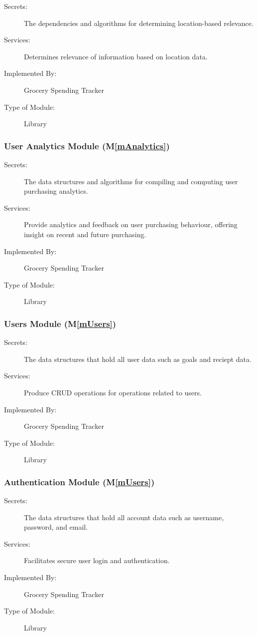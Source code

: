 \documentclass[12pt, titlepage]{article}
\newcommand{\mref}[1]{M\ref{#1}}
\begin{document}
\begin{description}
\item[Secrets:] The dependencies and algorithms for determining location-based relevance. 
\item[Services:] Determines relevance of information based on location data.
\item[Implemented By:] Grocery Spending Tracker
\item[Type of Module:] Library
\end{description}

\subsubsection{User Analytics Module (\mref{mAnalytics})}

\begin{description}
\item[Secrets:] The data structures and algorithms for compiling and computing user purchasing analytics. 
\item[Services:] Provide analytics and feedback on user purchasing behaviour, offering insight on recent and future purchasing.
\item[Implemented By:] Grocery Spending Tracker
\item[Type of Module:] Library
\end{description}

\subsubsection{Users Module (\mref{mUsers})}

\begin{description}
\item[Secrets:] The data structures that hold all user data such as goals and reciept data.
\item[Services:] Produce CRUD operations for operations related to users.
\item[Implemented By:] Grocery Spending Tracker
\item[Type of Module:] Library
\end{description}

\subsubsection{Authentication Module (\mref{mUsers})}

\begin{description}
\item[Secrets:] The data structures that hold all account data such as username, password, and email.
\item[Services:] Facilitates secure user login and authentication.
\item[Implemented By:] Grocery Spending Tracker
\item[Type of Module:] Library
\end{description}
\end{document}
